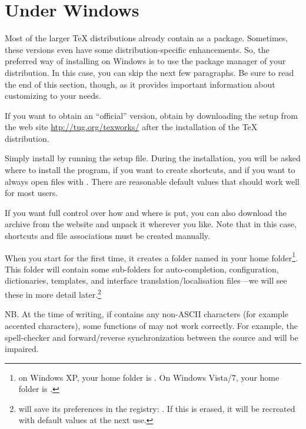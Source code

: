 \section{Under Windows}

Most of the larger {\TeX} distributions already contain {\Tw} as a package. Sometimes, these versions even have some distribution-specific enhancements. So, the preferred way of installing {\Tw} on Windows is to use the package manager of your distribution. In this case, you can skip the next few paragraphs. Be sure to read the end of this section, though, as it provides important information about customizing {\Tw} to your needs.

If you want to obtain an ``official'' version, obtain {\Tw} by downloading the setup from the {\Tw} web site \url{htp://tug.org/texworks/} after the installation of the {\TeX} distribution.

Simply install {\Tw} by running the setup file. During the installation, you will be asked where to install the program, if you want to create shortcuts, and if you want to always open  files with {\Tw}. There are reasonable default values that should work well for most users.

If you want full control over how and where {\Tw} is put, you can also download the  archive from the website and unpack it wherever you like. Note that in this case, shortcuts and file associations must be created manually.

\urldef{\TwRegistryPath}

When you start {\Tw} for the first time, it creates a folder named  in your home folder\footnote{on Windows XP, your home folder is . On Windows Vista/7, your home folder is .}. This folder will contain some sub-folders for auto-completion, configuration, dictionaries, templates, and interface translation/localisation files---we will see these in more detail later.\footnote{{\Tw} will save its preferences in the registry:
\TwRegistryPath. If this is erased, it will be recreated with default values at the next use.}

NB. At the time of writing, if  contains any non-ASCII characters (for example accented characters), some functions of {\Tw} may not work correctly. For example, the spell-checker and forward/reverse synchronization between the source and  will be impaired.

